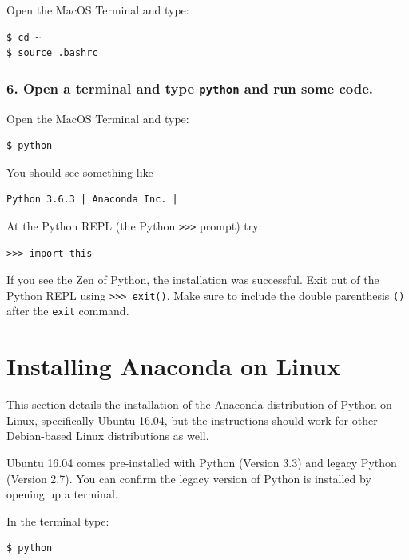 \documentclass{book}
\begin{document}
Open the MacOS Terminal and type:

\begin{lstlisting}
$ cd ~
$ source .bashrc
\end{lstlisting}

    \subsubsection{\texorpdfstring{6. Open a terminal and type
\texttt{python} and run some
code.}{6. Open a terminal and type python and run some code.}}\label{open-a-terminal-and-type-python-and-run-some-code.}

Open the MacOS Terminal and type:

\begin{lstlisting}
$ python
\end{lstlisting}

You should see something like

\begin{lstlisting}
Python 3.6.3 | Anaconda Inc. |
\end{lstlisting}

At the Python REPL (the Python \lstinline!>>>! prompt) try:

\begin{lstlisting}
>>> import this
\end{lstlisting}

If you see the Zen of Python, the installation was successful. Exit out
of the Python REPL using \lstinline!>>> exit()!. Make sure to include
the double parenthesis \lstinline!()! after the \lstinline!exit!
command.

    \section{Installing Anaconda on
Linux}\label{installing-anaconda-on-linux}

    This section details the installation of the Anaconda distribution of
Python on Linux, specifically Ubuntu 16.04, but the instructions should
work for other Debian-based Linux distributions as well.

Ubuntu 16.04 comes pre-installed with Python (Version 3.3) and legacy
Python (Version 2.7). You can confirm the legacy version of Python is
installed by opening up a terminal.

In the terminal type:

\begin{lstlisting}
$ python
\end{lstlisting}
\end{document}
